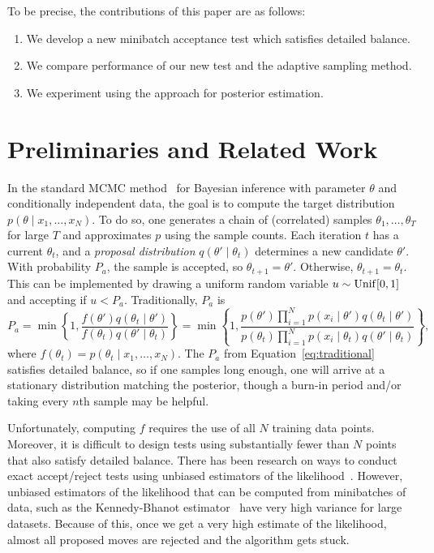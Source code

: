 \documentclass{article}
\begin{document}
To be precise, the contributions of this paper are as follows:

\begin{enumerate}[noitemsep]
    \item We develop a new minibatch acceptance test which satisfies detailed balance.
    \item We compare performance of our new test and the adaptive sampling method.
    \item We experiment using the approach for posterior estimation.
\end{enumerate}




\section{Preliminaries and Related Work}\label{sec:related_work}

In the standard MCMC method~\cite{gilks1996markov,brooks2011handbook} for Bayesian inference with
parameter $\theta$ and conditionally independent data, the goal is to compute the target
distribution $p(\theta \mid x_1, \ldots, x_N)$.  To do so, one generates a chain of (correlated)
samples $\theta_1, \ldots, \theta_T$ for large $T$ and approximates $p$ using the sample counts.
Each iteration $t$ has a current $\theta_t$, and a \emph{proposal distribution} $q(\theta' \mid
\theta_t)$ determines a new candidate $\theta'$. With probability $P_a$, the sample is accepted, so
$\theta_{t+1} = \theta'$. Otherwise, $\theta_{t+1} = \theta_t$. This can be implemented by drawing
a uniform random variable $u \sim {\rm Unif}[0,1]$ and accepting if $u < P_a$. Traditionally, $P_a$ is
\begin{equation}\label{eq:traditional}
P_a = \min\left\{ 1, \frac{f(\theta')q(\theta_t \mid \theta')}{f(\theta_t)q(\theta' \mid \theta_t)}
\right\} = \min\left\{ 1, \frac{p(\theta')\prod_{i=1}^N p(x_i \mid \theta')q(\theta_t \mid
\theta')}{p(\theta_t)\prod_{i=1}^N p(x_i \mid \theta_t)q(\theta' \mid
\theta_t)} \right\},
\end{equation}
where $f(\theta_t)=p(\theta_t \mid x_1,\ldots,x_N)$. The $P_a$ from Equation~\ref{eq:traditional}
satisfies detailed balance, so if one samples long enough, one will arrive at a stationary
distribution matching the posterior, though a burn-in period and/or taking every $n$th sample may be
helpful.

Unfortunately, computing $f$ requires the use of all $N$ training data points. Moreover, it is
difficult to design tests using substantially fewer than $N$ points that also satisfy detailed
balance. There has been research on ways to conduct exact accept/reject tests using unbiased
estimators of the likelihood~\cite{Andrieu09thepseudo-marginal}. However, unbiased estimators of the
likelihood that can be computed from minibatches of data, such as the Kennedy-Bhanot
estimator~\cite{PhysRevD} have very high variance for large datasets. Because of this, once we get a
very high estimate of the likelihood, almost all proposed moves are rejected and the algorithm gets
stuck.
\end{document}
